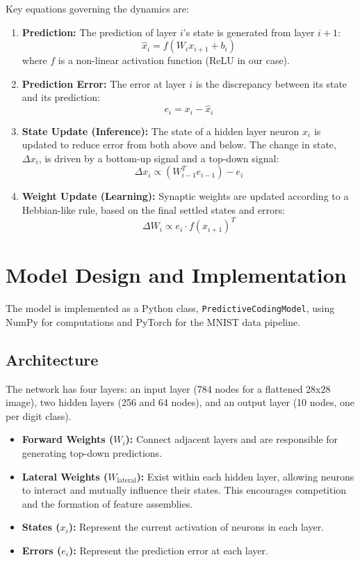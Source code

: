 \documentclass[a4paper,12pt]{article}
\begin{document}
Key equations governing the dynamics are:
\begin{enumerate}
    \item \textbf{Prediction:} The prediction of layer $i$'s state is generated from layer $i+1$: 
    \[ \hat{x}_i = f(W_i x_{i+1} + b_i) \]
    where $f$ is a non-linear activation function (ReLU in our case).

    \item \textbf{Prediction Error:} The error at layer $i$ is the discrepancy between its state and its prediction:
    \[ e_i = x_i - \hat{x}_i \]

    \item \textbf{State Update (Inference):} The state of a hidden layer neuron $x_i$ is updated to reduce error from both above and below. The change in state, $\Delta x_i$, is driven by a bottom-up signal and a top-down signal:
    \[ \Delta x_i \propto (W_{i-1}^T e_{i-1}) - e_i \]
    
    \item \textbf{Weight Update (Learning):} Synaptic weights are updated according to a Hebbian-like rule, based on the final settled states and errors:
    \[ \Delta W_i \propto e_i \cdot f(x_{i+1})^T \]
\end{enumerate}

\section{Model Design and Implementation}
The model is implemented as a Python class, \texttt{PredictiveCodingModel}, using NumPy for computations and PyTorch for the MNIST data pipeline.

\subsection{Architecture}
The network has four layers: an input layer (784 nodes for a flattened 28x28 image), two hidden layers (256 and 64 nodes), and an output layer (10 nodes, one per digit class).
\begin{itemize}
    \item \textbf{Forward Weights ($W_i$):} Connect adjacent layers and are responsible for generating top-down predictions.
    \item \textbf{Lateral Weights ($W_{\text{lateral}}$):} Exist within each hidden layer, allowing neurons to interact and mutually influence their states. This encourages competition and the formation of feature assemblies.
    \item \textbf{States ($x_i$):} Represent the current activation of neurons in each layer.
    \item \textbf{Errors ($e_i$):} Represent the prediction error at each layer.
\end{itemize}
\end{document}
